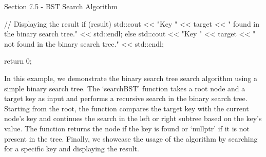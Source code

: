 \begin{notes}{Section 7.5 - BST Search Algorithm}
\begin{highlight}
\begin{code}[C++]
{        // Displaying the result
        if (result)
            std::cout << "Key " << target << " found in the binary search tree." << std::endl;
        else
            std::cout << "Key " << target << " not found in the binary search tree." << std::endl;
    
        return 0;
    }
    \end{code}
        In this example, we demonstrate the binary search tree search algorithm using a simple binary search tree. The `searchBST' function takes a root node and a target key as input and performs a recursive search in the binary search tree. Starting from the root, the function compares the target key with the current node's key and 
        continues the search in the left or right subtree based on the key's value. The function returns the node if the key is found or `nullptr' if it is not present in the tree. Finally, we showcase the usage of the algorithm by searching for a specific key and displaying the result.
    \end{highlight}
\end{notes}

